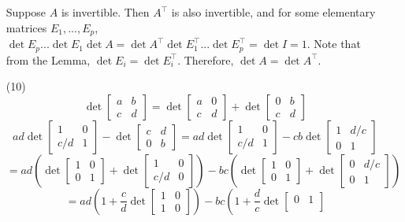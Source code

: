 \begin{itemize}
Suppose $A$ is invertible. Then $A^\top$ is also invertible, and for some elementary matrices $E_1, ..., E_p$, $\det E_p...\det E_1\det A = \det A^\top \det E_1^\top ... \det E_p^\top = \det I = 1$. Note that from the Lemma, $\det E_i = \det E_i^\top$. Therefore, $\det A = \det A^\top$.
\item[(10)]
$$\det\begin{bmatrix}
a & b \\
c & d
\end{bmatrix} = \det\begin{bmatrix}
a & 0 \\
c & d
\end{bmatrix} + \det\begin{bmatrix}
0 & b \\
c & d
\end{bmatrix}$$
$$ad\det\begin{bmatrix}
1 & 0 \\
c/d & 1
\end{bmatrix} - \det\begin{bmatrix}
c & d \\
0 & b
\end{bmatrix} = ad\det\begin{bmatrix}
1 & 0 \\
c/d & 1
\end{bmatrix} - cb\det\begin{bmatrix}
1 & d/c \\
0 & 1
\end{bmatrix}$$
$$= ad\left(\det\begin{bmatrix}
1 & 0 \\
0 & 1
\end{bmatrix} + \det\begin{bmatrix}
1 & 0 \\
c/d & 0
\end{bmatrix}\right) - bc\left(\det\begin{bmatrix}
1 & 0 \\
0 & 1
\end{bmatrix} + \det\begin{bmatrix}
0 & d/c \\
0 & 1
\end{bmatrix}\right)$$
$$= ad\left(1 + \frac{c}{d}\det\begin{bmatrix}
1 & 0 \\
1 & 0
\end{bmatrix}\right) - bc\left(1 + \frac{d}{c}\det\begin{bmatrix}
0 & 1 \\

\end{bmatrix}$$
\end{itemize}
